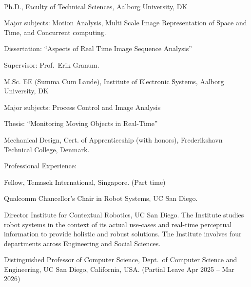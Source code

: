 \documentclass{article}
\newenvironment{sublist}{%
  \begin{list}{}{%
      \setlength{\itemsep}{0em}\setlength{\parsep}{0em}%
      \setlength{\topsep}{0em}\setlength{\parskip}{0em}%
    }%
}%
{ \end{list} }
\begin{document}
\begin{cv}
	\begin{cvlist}{~}
		\item[1989] Ph.D., Faculty of Technical Sciences, Aalborg
		University, DK
		\begin{sublist}
			\item Major subjects: Motion Analysis, Multi Scale Image
			Representation of Space and Time, and Concurrent computing.
			\item Dissertation: ``Aspects of Real Time Image Sequence Analysis''
			\item Supervisor: Prof.\ Erik Granum.
		\end{sublist}
		\item[1987] M.Sc. EE (Summa Cum Laude), Institute of Electronic
		Systems, Aalborg University, DK
		\begin{sublist}
			\item Major subjects: Process Control and Image Analysis
			\item Thesis: ``Monitoring Moving Objects in Real-Time''
		\end{sublist}
		\item[1981] Mechanical Design, Cert.
		of Apprenticeship (with honors), Frederikshavn Technical
		College, Denmark.
	\end{cvlist}



	\begin{cvlist}{Professional Experience:}
		\item[Apr 2025 -- Mar 2026] Fellow, Temasek International, Singapore. (Part time)

		\item[Jul 2017 --] Qualcomm Chancellor's Chair in Robot Systems, UC San Diego.

		\item[Aug 2016 --] Director Institute for Contextual Robotics, UC San
		Diego. The Institute studies robot systems in the context of its
		actual use-cases and real-time perceptual information to provide
		holistic and robust solutions. The Institute involves four
		departments across Engineering and Social Sciences.

		\item[Aug 2016 --] Distinguished Professor of Computer Science, Dept.\ of
		Computer Science and Engineering, UC San Diego, California, USA.\@
		(Partial Leave Apr 2025 -- Mar 2026)


\end{cvlist}
\end{cv}
\end{document}
